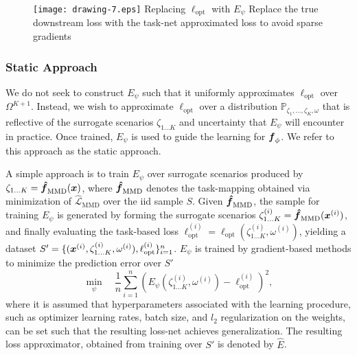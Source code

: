 \begin{figure}[h]
  \FIGURE
  {\texttt{[image: drawing-7.eps]}}
  {Replacing $\ell_{\text{opt}}$ with $E_{\psi}$ \label{fig:overall approach}}
  {Replace the true downstream loss with the task-net approximated loss to avoid sparse gradients}
\end{figure}


\subsubsection*{Static Approach} 
We do not seek to construct $E_{\psi}$ such that it uniformly approximates $\ell_{\text{opt}}$ over $\Omega^{K+1}$. Instead, we wish to approximate $\ell_{\text{opt}}$ over a distribution $\mathbb{P}_{\zeta_1, \hdots, \zeta_K, \omega}$ that is reflective of the surrogate scenarios $\zeta_{1 \hdots K}$ and uncertainty that $E_{\psi}$ will encounter in practice. Once trained, $E_{\psi}$ is used to guide the learning for $\boldsymbol{f}_{\phi}$. We refer to this approach as the static approach.

A simple approach is to train $E_{\psi}$ over surrogate scenarios produced by \hbox{$\zeta_{1 \hdots K} = \boldsymbol{\hat{f}}_{\text{MMD}}(\boldsymbol{x})$}, where $\boldsymbol{\hat{f}}_{\text{MMD}}$ denotes the task-mapping obtained via minimization of $\hat{\mathcal{L}}_{\text{MMD}}$ over the iid sample $S$. Given $ \boldsymbol{\hat{f}}_{\text{MMD}}$, the sample for training $E_{\psi}$ is generated by forming the surrogate scenarios $\zeta_{1 \hdots K}^{(i)} = \boldsymbol{\hat{f}}_{\text{MMD}}(\boldsymbol{x}^{(i)})$, and finally evaluating the task-based loss $\ell_{\text{opt}}^{(i)} = \ell_{\text{opt}}(\zeta_{1 \hdots K}^{(i)}, \omega^{(i)})$, yielding a dataset \hbox{$S' = \{(\boldsymbol{x}^{(i)}, \zeta_{1 \hdots K}^{(i)}, \omega^{(i)} ), \ell_{\text{opt}}^{(i)} \}_{i=1}^{n}$}. $E_{\psi}$ is trained by gradient-based methods to minimize the prediction error over $S'$
\begin{equation*}
\min_{\psi} \quad \frac{1}{n} \sum_{i = 1}^{n} \left(E_{\psi}(\zeta_{1...K}^{(i)}, \omega^{(i)})  - \ell_{\text{opt}}^{(i)} \right)^2,
\end{equation*}
where it is assumed that hyperparameters associated with the learning procedure, such as optimizer learning rates, batch size, and $l_2$ regularization on the weights, can be set such that the resulting loss-net achieves generalization. The resulting loss approximator, obtained from training over $S'$ is denoted by $\hat{E}$.


